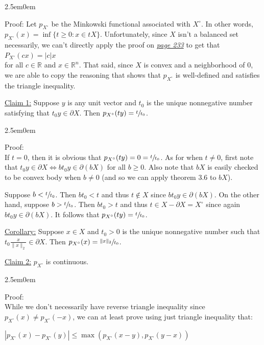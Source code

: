 \documentclass{book}
\newcommand{\inLinkRap}[2]{{\color{blue}\hyperlink{#1}{\textit{#2}}}}
\newcommand{\exThreeP}{%
   \color{RedViolet}%
   \fontsize{12}{14}\selectfont%
}
\newcommand{\exPPP}{%
   \color{VioletRed}%
   \fontsize{12}{14}\selectfont%
}
\newenvironment{myIndent}{%
   \begin{adjustwidth}{2.5em}{0em}%
}{%
   \end{adjustwidth}%
}
\newcommand{\retTwo}{\hfill\bigbreak}
\begin{document}
\begin{myIndent}\exThreeP
	Proof:\newpage
	Let $p_{X^\circ}$ be the Minkowski functional associated with $X^\circ$. In other words,\\ $p_{X^\circ}(x) = \inf \{t \geq 0 : x \in tX\}$. Unfortunately, since $X$ isn't a balanced set\\ necessarily, we can't directly apply the proof on \inLinkRap{Minkowski functional reference}{page 233} to get that $P_{X^\circ}(cx) = |c|x$\\ for all $c \in \mathbb{R}$ and $x \in \mathbb{R}^n$. That said, since $X$ is convex and a neighborhood of $0$, we are able to copy the reasoning that shows that $p_{X^\circ}$ is well-defined and satisfies the triangle inequality.\retTwo

	\ul{Claim 1:} Suppose $y$ is any unit vector and $t_0$ is the unique nonnegative number satisfying that $t_0 y \in \partial X$. Then $p_{X^\circ}(ty) = \sfrac{t}{t_0}$.
	\begin{myIndent}\exPPP
		Proof:\\
		If $t = 0$, then it is obvious that $p_{X^\circ}(ty) = 0 = \sfrac{t}{t_0}$. As for when $t \neq 0$, first note that $t_0 y \in \partial X \Longleftrightarrow bt_0 y \in \partial(bX)$ for all $b \geq 0$. Also note that $bX$ is easily checked to be convex body when $b \neq 0$ (and so we can apply theorem 3.6 to $bX$).\retTwo

		Suppose $b < \sfrac{t}{t_0}$. Then $bt_0 < t$ and thus $t \notin X$ since $bt_0 y \in \partial (bX)$. On the other hand, suppose $b > \sfrac{t}{t_0}$. Then $bt_0 > t$ and thus $t \in X - \partial X = X^\circ$ since again $bt_0 y \in \partial (bX)$. It follows that $p_{X^\circ}(ty) = \sfrac{t}{t_0}$.\retTwo
	\end{myIndent}

	\ul{Corollary:} Suppose $x \in X$ and $t_0 > 0$ is the unique nonnegative number such that\\ $t_0 \frac{x}{\|x\|_2} \in \partial X$. Then $p_{X^\circ}(x) = \sfrac{\|x\|_2}{t_0}$.\retTwo

	\ul{Claim 2:} $p_{X^\circ}$ is continuous.
	\begin{myIndent}\exPPP
		Proof:\\
		While we don't necessarily have reverse triangle inequality since $p_{X^\circ}(x) \neq p_{X^\circ}(-x)$, we can at least prove using just triangle inequality that:

		{\centering $|p_{X^\circ}(x) - p_{X^\circ}(y)| \leq \max(p_{X^\circ}(x - y), p_{X^\circ}(y - x))$ \retTwo\par}


\end{myIndent}
\end{myIndent}
\end{document}
